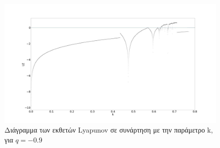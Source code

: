 \begin{figure}[ht]
	\centering
	\includegraphics[width=1\linewidth]{LateX images/graphs q09/g2}
	\caption{Διάγραμμα των εκθετών Lyapunov σε συνάρτηση με την παράμετρο k, για $q=-0.9$}
	\label{f:g15}
\end{figure}

